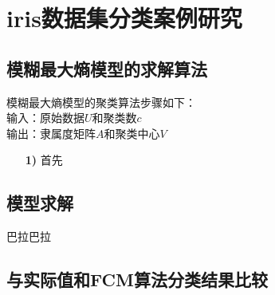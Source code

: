 \chapter{iris数据集分类案例研究}
\section{模糊最大熵模型的求解算法}
模糊最大熵模型的聚类算法步骤如下：\\
输入：原始数据$U$和聚类数$c$\\
输出：隶属度矩阵$A$和聚类中心$V$
\begin{itemize}
    \item[\bf{1)}]首先
\end{itemize}

\section{模型求解}
巴拉巴拉
\section{与实际值和FCM算法分类结果比较}